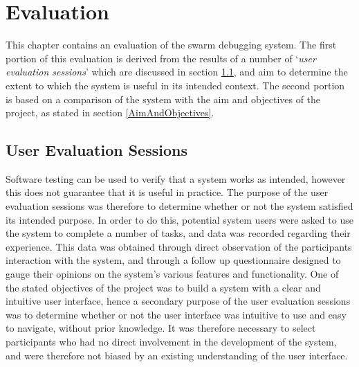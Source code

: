 
\chapter[Evaluation]{Evaluation} %

\label{ChapterEvaluation} %

This chapter contains an evaluation of the swarm debugging system. The first portion of this evaluation is derived from the results of a number of `\textit{user evaluation sessions}' which are discussed in section \ref{UserEvaluationSessions}, and aim to determine the extent to which the system is useful in its intended context. The second portion is based on a comparison of the system with the aim and objectives of the project, as stated in section \ref{AimAndObjectives}.


\section{User Evaluation Sessions} \label{UserEvaluationSessions}

Software testing can be used to verify that a system works as intended, however this does not guarantee that it is useful in practice. The purpose of the user evaluation sessions was therefore to determine whether or not the system satisfied its intended purpose. In order to do this, potential system users were asked to use the system to complete a number of tasks, and data was recorded regarding their experience. This data was obtained through direct observation of the participants interaction with the system, and through a follow up questionnaire designed to gauge their opinions on the system's various features and functionality. One of the stated objectives of the project was to build a system with a clear and intuitive user interface, hence a secondary purpose of the user evaluation sessions was to determine whether or not the user interface was intuitive to use and easy to navigate, without prior knowledge. It was therefore necessary to select participants who had no direct involvement in the development of the system, and were therefore not biased by an existing understanding of the user interface.

